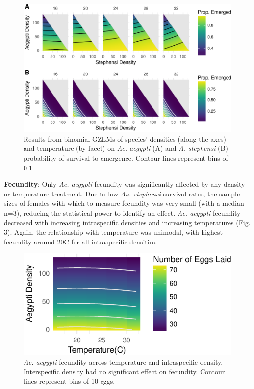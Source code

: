 \documentclass[12pt,]{article}
\begin{document}
\begin{figure}[htbp]
\centering
\includegraphics{manuscript_files/figure-latex/fig2-1.pdf}
\caption{Results from binomial GZLMs of species' densities (along the
axes) and temperature (by facet) on \emph{Ae. aegypti} (A) and \emph{A.
stephensi} (B) probability of survival to emergence. Contour lines
represent bins of 0.1.}
\end{figure}

\textbf{Fecundity}: Only \emph{Ae. aegypti} fecundity was significantly
affected by any density or temperature treatment. Due to low \emph{An.
stephensi} survival rates, the sample sizes of females with which to
measure fecundity was very small (with a median n=3), reducing the
statistical power to identify an effect. \emph{Ae. aegypti} fecundity
decreased with increasing intraspecific densities and increasing
temperatures (Fig. 3). Again, the relationship with temperature was
unimodal, with highest fecundity around 20C for all intraspecific
densities.

\begin{figure}[htbp]
\centering
\includegraphics{manuscript_files/figure-latex/fig3-1.pdf}
\caption{\emph{Ae. aegypti} fecundity across temperature and
intraspecific density. Interspecific density had no significant effect
on fecundity. Contour lines represent bins of 10 eggs.}
\end{figure}
\end{document}
